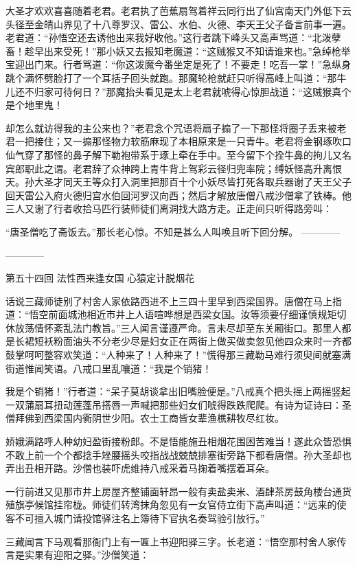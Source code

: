 \documentclass[12pt,UTF8]{ctexbook}
\begin{document}
大圣才欢欢喜喜随着老君。老君执了芭蕉扇驾着祥云同行出了仙宫南天门外低下云头径至金皘山界见了十八尊罗汉、雷公、水伯、火德、李天王父子备言前事一遍。老君道：“孙悟空还去诱他出来我好收他。”这行者跳下峰头又高声骂道：“北泼孽畜！趁早出来受死！”那小妖又去报知老魔道：“这贼猴又不知请谁来也。”急绰枪举宝迎出门来。行者骂道：“你这泼魔今番坐定是死了！不要走！吃吾一掌！”急纵身跳个满怀劈脸打了一个耳括子回头就跑。那魔轮枪就赶只听得高峰上叫道：“那牛儿还不归家可待何日？”那魔抬头看见是太上老君就唬得心惊胆战道：“这贼猴真个是个地里鬼！

却怎么就访得我的主公来也？”老君念个咒语将扇子搧了一下那怪将圈子丢来被老君一把接住；又一搧那怪物力软筋麻现了本相原来是一只青牛。老君将金钢琢吹口仙气穿了那怪的鼻子解下勒袍带系于琢上牵在手中。至今留下个拴牛鼻的拘儿又名宾郎职此之谓。老君辞了众神跨上青牛背上驾彩云径归兜率院；缚妖怪高升离恨天。孙大圣才同天王等众打入洞里把那百十个小妖尽皆打死各取兵器谢了天王父子回天雷公入府火德归宫水伯回河罗汉向西；然后才解放唐僧八戒沙僧拿了铁棒。他三人又谢了行者收拾马匹行装师徒们离洞找大路方走。正走间只听得路旁叫：

“唐圣僧吃了斋饭去。”那长老心惊。不知是甚么人叫唤且听下回分解。
------------


------------

第五十四回 法性西来逢女国 心猿定计脱烟花

话说三藏师徒别了村舍人家依路西进不上三四十里早到西梁国界。唐僧在马上指道：“悟空前面城池相近市井上人语喧哗想是西梁女国。汝等须要仔细谨慎规矩切休放荡情怀紊乱法门教旨。”三人闻言谨遵严命。言未尽却至东关厢街口。那里人都是长裙短袄粉面油头不分老少尽是妇女正在两街上做买做卖忽见他四众来时一齐都鼓掌呵呵整容欢笑道：“人种来了！人种来了！”慌得那三藏勒马难行须臾间就塞满街道惟闻笑语。八戒口里乱嚷道：“我是个销猪！

我是个销猪！”行者道：“呆子莫胡谈拿出旧嘴脸便是。”八戒真个把头摇上两摇竖起一双蒲扇耳扭动莲蓬吊搭唇一声喊把那些妇女们唬得跌跌爬爬。有诗为证诗曰：圣僧拜佛到西梁国内衠阴世少阳。农士工商皆女辈渔樵耕牧尽红妆。

娇娥满路呼人种幼妇盈街接粉郎。不是悟能施丑相烟花围困苦难当！遂此众皆恐惧不敢上前一个个都捻手矬腰摇头咬指战战兢兢排塞街旁路下都看唐僧。孙大圣却也弄出丑相开路。沙僧也装吓虎维持八戒采着马掬着嘴摆着耳朵。

一行前进又见那市井上房屋齐整铺面轩昂一般有卖盐卖米、酒肆茶房鼓角楼台通货殖旗亭候馆挂帘栊。师徒们转湾抹角忽见有一女官侍立街下高声叫道：“远来的使客不可擅入城门请投馆驿注名上簿待下官执名奏驾验引放行。”

三藏闻言下马观看那衙门上有一匾上书迎阳驿三字。长老道：“悟空那村舍人家传言是实果有迎阳之驿。”沙僧笑道：
\end{document}
